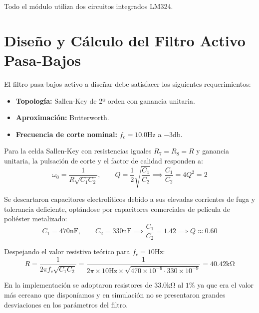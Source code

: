Todo el módulo utiliza dos circuitos integrados LM324.

\section{Diseño y Cálculo del Filtro Activo Pasa-Bajos}
El filtro pasa-bajos activo a diseñar debe satisfacer los siguientes requerimientos:
\begin{itemize}
    \item \textbf{Topología:} Sallen-Key de 2º orden con ganancia unitaria.
    \item \textbf{Aproximación:} Butterworth.
    \item \textbf{Frecuencia de corte nominal:} $f_c = 10.0 \unit{\hertz}$ a $-3 \unit{\decibel}$.
\end{itemize}

Para la celda Sallen-Key con resistencias iguales $R_7 = R_8 = R$ y ganancia unitaria, la pulsación de corte y el
factor de calidad responden a:
\begin{equation}
\omega_0 = \frac{1}{R\sqrt{C_1 C_2}}, \qquad Q = \frac{1}{2}\sqrt{\frac{C_1}{C_2}} \implies \frac{C_1}{C_2} = 4 Q^2 = 2
\end{equation}

Se descartaron capacitores electrolíticos debido a sus elevadas corrientes de fuga y tolerancia deficiente, optándose
por capacitores comerciales de película de poliéster metalizado:
\begin{equation*}
C_1 = 470 \unit{\nano\farad}, \qquad C_2 = 330 \unit{\nano\farad} \implies \frac{C_1}{C_2} = 1.42 \implies Q \approx 0.60
\end{equation*}

Despejando el valor resistivo teórico para $f_c = 10 \unit{\hertz}$:
\begin{equation*}
R = \frac{1}{2\pi f_c \sqrt{C_1 C_2}} = \frac{1}{2\pi \times 10 \unit{\hertz} \times \sqrt{470\times 10^{-9} \cdot 330\times 10^{-9}}} = 40.42 \unit{\kilo\ohm}
\end{equation*}

En la implementación se adoptaron resistores de $33.0 \unit{\kilo\ohm}$ al $1\%$ ya que era el valor más cercano que
disponíamos y en simulación no se presentaron grandes desviaciones en los parámetros del filtro.

